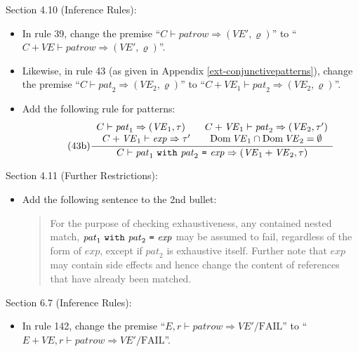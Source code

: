 \documentclass[twoside,titlepage]{article}
\begin{document}
\begin{appendix}
Section 4.10 (Inference Rules):
\begin{itemize}
\item In rule 39, change the premise ``$C \vdash \mathit{patrow} \Rightarrow (\mathit{VE}',\varrho)$'' to ``$C+\mathit{VE} \vdash \mathit{patrow} \Rightarrow (\mathit{VE}',\varrho)$''.

\item Likewise, in rule 43 (as given in Appendix \ref{ext-conjunctivepatterns}), change the premise ``$C \vdash \mathit{pat}_2 \Rightarrow (\mathit{VE}_2,\varrho)$'' to ``$C+\mathit{VE}_1 \vdash \mathit{pat}_2 \Rightarrow (\mathit{VE}_2,\varrho)$''.

\item Add the following rule for patterns:
  \begin{equation}
  \tag{43b}
  \frac{
  \begin{array}{c}
  C \vdash \mathit{pat}_1 \Rightarrow (\mathit{VE}_1,\tau)
  \qquad
  C+\mathit{VE}_1 \vdash \mathit{pat}_2 \Rightarrow (\mathit{VE}_2,\tau')
  \\
  C+\mathit{VE}_1 \vdash \mathit{exp} \Rightarrow \tau'
  \qquad
  \mbox{Dom}\,\mathit{VE}_1 \cap \mbox{Dom}\,\mathit{VE}_2 = \emptyset
  \end{array}
  }{
  C \vdash \mathit{pat}_1~{\tt{with}}~\mathit{pat}_2~\mbox{\tt=}~\mathit{exp} \Rightarrow (\mathit{VE}_1+\mathit{VE}_2,\tau)
  }
  \end{equation}
\end{itemize}

Section 4.11 (Further Restrictions):
\begin{itemize}
\item Add the following sentence to the 2nd bullet:
  \begin{quote}
 For the purpose of checking exhaustiveness, any contained nested match, $\mathit{pat}_1~{\tt{with}}~\mathit{pat}_2~\mbox{\tt=}~\mathit{exp}$ may be assumed to fail, regardless of the form of $\mathit{exp}$, except if $\mathit{pat}_2$ is exhaustive itself. Further note that $\mathit{exp}$ may contain side effects and hence change the content of references that have already been matched.
  \end{quote}
\end{itemize}

Section 6.7 (Inference Rules):
\begin{itemize}
\item In rule 142, change the premise ``$E,r \vdash \mathit{patrow} \Rightarrow \mathit{VE}'/\mbox{FAIL}$'' to ``$E+\mathit{VE},r \vdash \mathit{patrow} \Rightarrow \mathit{VE}'/\mbox{FAIL}$''.


\end{itemize}
\end{appendix}
\end{document}
